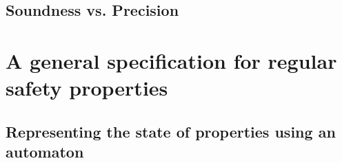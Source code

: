 \section{Soundness vs. Precision}


\chapter{A general specification for regular safety properties}

\section{Representing the state of properties using an automaton}


